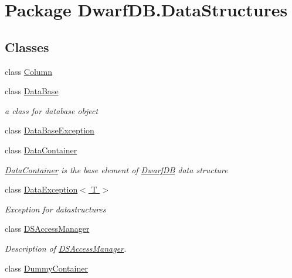 \hypertarget{namespace_dwarf_d_b_1_1_data_structures}{\section{Package Dwarf\+D\+B.\+Data\+Structures}
\label{namespace_dwarf_d_b_1_1_data_structures}
}
\subsection*{Classes}
\begin{DoxyCompactItemize}
\item 
class \hyperlink{class_dwarf_d_b_1_1_data_structures_1_1_column}{Column}
\item 
class \hyperlink{class_dwarf_d_b_1_1_data_structures_1_1_data_base}{Data\+Base}
\begin{DoxyCompactList}\small\item\em a class for database object \end{DoxyCompactList}\item 
class \hyperlink{class_dwarf_d_b_1_1_data_structures_1_1_data_base_exception}{Data\+Base\+Exception}
\item 
class \hyperlink{class_dwarf_d_b_1_1_data_structures_1_1_data_container}{Data\+Container}
\begin{DoxyCompactList}\small\item\em \hyperlink{class_dwarf_d_b_1_1_data_structures_1_1_data_container}{Data\+Container} is the base element of \hyperlink{namespace_dwarf_d_b}{Dwarf\+D\+B} data structure \end{DoxyCompactList}\item 
class \hyperlink{class_dwarf_d_b_1_1_data_structures_1_1_data_exception_3_01_t_01_4}{Data\+Exception$<$ T $>$}
\begin{DoxyCompactList}\small\item\em Exception for datastructures \end{DoxyCompactList}\item 
class \hyperlink{class_dwarf_d_b_1_1_data_structures_1_1_d_s_access_manager}{D\+S\+Access\+Manager}
\begin{DoxyCompactList}\small\item\em Description of \hyperlink{class_dwarf_d_b_1_1_data_structures_1_1_d_s_access_manager}{D\+S\+Access\+Manager}. \end{DoxyCompactList}\item 
class \hyperlink{class_dwarf_d_b_1_1_data_structures_1_1_dummy_container}{Dummy\+Container}

\end{DoxyCompactItemize}
